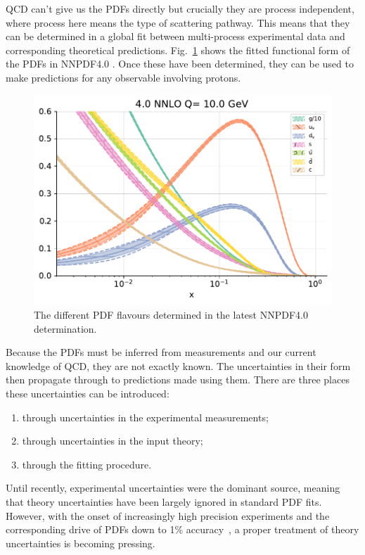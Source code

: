 \documentclass[a4paper,12pt,oneside,openright]{book}
\numberwithin{equation}{section}
\numberwithin{figure}{section}
\numberwithin{table}{section}
\begin{document}
QCD can't give us the PDFs directly but crucially they are process independent, where process here means the type of scattering pathway. This means that
they can be determined in a global fit between multi-process experimental data and corresponding
theoretical predictions.
Fig.~\ref{fig:pdfs} shows the fitted functional form of the PDFs in NNPDF4.0 \cite{Ball:2017nwa}. Once these have been determined, they can be used to make predictions for any observable involving protons.
\begin{figure}[h]
\centering
\includegraphics[width=\textwidth]{pdfflavourplot.pdf}
\caption{The different PDF flavours determined in the latest NNPDF4.0 determination. \label{fig:pdfs}}
\end{figure}

Because the PDFs must be inferred from measurements and our current knowledge of QCD, they are not exactly known. The uncertainties in their form then propagate through to predictions made using them. There are three
places these uncertainties can be introduced:
\begin{enumerate}
\item through uncertainties in the experimental measurements;
\item through uncertainties in the input theory;
\item through the fitting procedure.
\end{enumerate}
Until recently, experimental uncertainties were the dominant source, meaning that theory uncertainties have been largely ignored in standard PDF fits. However, with the onset of increasingly high precision experiments and the corresponding drive of PDFs down to 1\% accuracy~\cite{Cepeda:2019klc,Azzi:2019yne}, a proper treatment of theory uncertainties is becoming pressing. 
\end{document}
